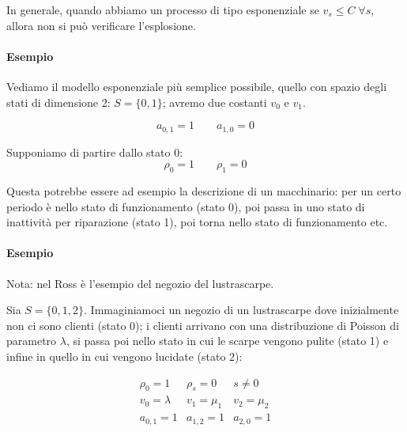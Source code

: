 \documentclass[a4paper,12pt]{book}
\begin{document}
In generale, quando abbiamo un processo di tipo esponenziale se $ v_s \le C \; \forall s$, allora non si può verificare l'esplosione. 

\paragraph{Esempio} Vediamo il modello esponenziale più semplice possibile, quello con spazio degli stati di dimensione 2: $ S = \{0,1\} $; avremo due costanti $ v_0 $ e $ v_1 $.

$$ a_{0,1} = 1 \qquad a_{1,0} = 0 $$

Supponiamo di partire dallo stato 0:
$$ \rho_0 = 1 \qquad \rho_1 = 0 $$

Questa potrebbe essere ad esempio la descrizione di un macchinario: per un certo periodo è nello stato di funzionamento (stato 0), poi passa in uno stato di inattività per riparazione (stato 1), poi torna nello stato di funzionamento etc. 

\paragraph{Esempio} Nota: nel Ross è l'esempio del negozio del lustrascarpe. 

Sia $ S = \{0,1,2\} $. Immaginiamoci un negozio di un lustrascarpe dove inizialmente non ci sono clienti (stato 0); i clienti arrivano con una distribuzione di Poisson di parametro $\lambda$, si passa poi nello stato in cui le scarpe vengono pulite (stato 1) e infine in quello in cui vengono lucidate (stato 2):

\begin{multicols}{2}
	$$ \begin{array}{ccc}
		\rho_0 = 1 & \rho_s = 0 & s \ne 0 \\
		v_0 = \lambda & v_1 = \mu_1 & v_2 = \mu_2 \\
		a_{0,1} = 1 & a_{1,2} = 1 & a_{2,0} = 1
	\end{array} $$
	\\
	\\
\end{multicols}
\end{document}
